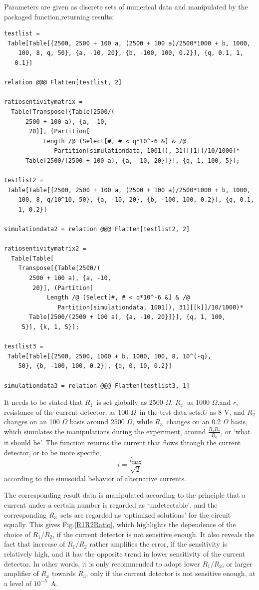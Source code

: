 \documentclass[%
 reprint,
 amsmath,amssymb,
 aps,
]{revtex4-1}
\begin{document}
Parameters are given as discrete sets of numerical data and manipulated by the packaged function,returning results:
\begin{lstlisting}
testlist = 
 Table[Table[{2500, 2500 + 100 a, (2500 + 100 a)/2500*1000 + b, 1000, 
    100, 8, q, 50}, {a, -10, 20}, {b, -100, 100, 0.2}], {q, 0.1, 1, 
   0.1}]

relation @@@ Flatten[testlist, 2]

ratiosentivitymatrix = 
  Table[Transpose[{Table[2500/(
      2500 + 100 a), {a, -10, 
       20}], (Partition[
           Length /@ (Select[#, # < q*10^-6 &] & /@ 
              Partition[simulationdata, 1001]), 31][[1]]/10/1000)*
      Table[2500/(2500 + 100 a), {a, -10, 20}]}], {q, 1, 100, 5}];

testlist2 = 
 Table[Table[{2500, 2500 + 100 a, (2500 + 100 a)/2500*1000 + b, 1000, 
    100, 8, q/10^10, 50}, {a, -10, 20}, {b, -100, 100, 0.2}], {q, 0.1,
    1, 0.2}]

simulationdata2 = relation @@@ Flatten[testlist2, 2]

ratiosentivitymatrix2 = 
  Table[Table[
    Transpose[{Table[2500/(
       2500 + 100 a), {a, -10, 
        20}], (Partition[
            Length /@ (Select[#, # < q*10^-6 &] & /@ 
               Partition[simulationdata, 1001]), 31][[k]]/10/1000)*
       Table[2500/(2500 + 100 a), {a, -10, 20}]}], {q, 1, 100, 
     5}], {k, 1, 5}];

testlist3 = 
 Table[Table[{2500, 2500, 1000 + b, 1000, 100, 8, 10^(-q), 
    50}, {b, -100, 100, 0.2}], {q, 0, 10, 0.2}]

simulationdata3 = relation @@@ Flatten[testlist3, 1]
\end{lstlisting}
It needs to be stated that $R_1$~is set globally as 2500 $\Omega$, $R_x$~as 1000 $\Omega$,and $r$, resistance of the current detector, as 100 $\Omega$~in the test data sets,$U$ as 8 V, and $R_2$ changes on an 100 $\Omega$ basis around 2500 $\Omega$, while $R_3$~changes on an 0.2 $\Omega$ basis, which simulates the manipulations during the experiment, around $\frac{R_1R_2}{R_x}$, or `what it should be'. The function returns the current that flows through the current detector, or to be more specific,
\begin{equation}
i = \frac{i_\text{max}}{\sqrt{2}}
\end{equation}
according to the sinusoidal behavior of alternative currents.
 
The corresponding result data is manipulated according to the principle that a current under a certain number is regarded as `undetectable', and the corresponding $R_3$~sets are regarded as `optimized solutions' for the circuit equally. This gives Fig.\ref{R1R2Ratio}, which highlights the dependence of the choice of $R_1/R_2$, if the current detector is not sensitive enough. It also reveals the fact that increase of $R_1/R_2$ rather amplifies the error, if the sensitivity is relatively high, and it has the opposite trend in lower sensitivity of the current detector. In other words, it is only recommended to adopt lower $R_1/R_2$, or larger amplifier of $R_x$ towards $R_3$, only if the current detector is not sensitive enough, at a level of $10^{-5}$~A.
\end{document}
